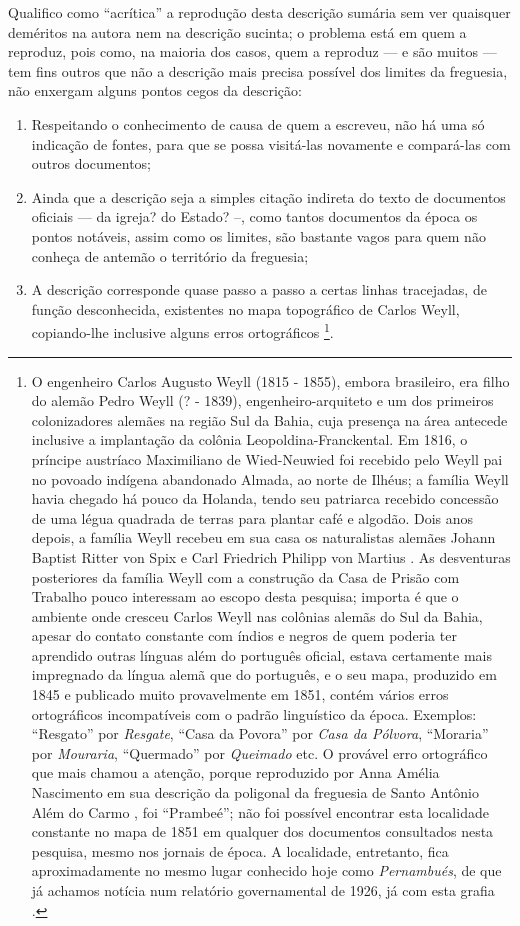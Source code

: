 Qualifico como ``acrítica'' a reprodução desta descrição sumária sem ver quaisquer deméritos na autora nem na descrição sucinta; o problema está em quem a reproduz, pois como, na maioria dos casos, quem a reproduz --- e são muitos --- tem fins outros que não a descrição mais precisa possível dos limites da freguesia, não enxergam alguns pontos cegos da descrição:
\begin{enumerate}
\item Respeitando o conhecimento de causa de quem a escreveu, não há uma só indicação de fontes, para que se possa visitá-las novamente e compará-las com outros documentos;
\item Ainda que a descrição seja a simples citação indireta do texto de documentos oficiais --- da igreja? do Estado? --, como tantos documentos da época os pontos notáveis, assim como os limites, são bastante vagos para quem não conheça de antemão o território da freguesia;
\item A descrição corresponde quase passo a passo a certas linhas tracejadas, de função desconhecida, existentes no mapa topográfico de Carlos Weyll, copiando-lhe inclusive alguns erros ortográficos \cite{weyll_mappa_1851}\footnote{O engenheiro Carlos Augusto Weyll (1815 - 1855), embora brasileiro, era filho do alemão Pedro Weyll (? - 1839), engenheiro-arquiteto e um dos primeiros colonizadores alemães na região Sul da Bahia, cuja presença na área antecede inclusive a implantação da colônia Leopoldina-Franckental. Em 1816, o príncipe austríaco Maximiliano de Wied-Neuwied foi recebido pelo Weyll pai no povoado indígena abandonado Almada, ao norte de Ilhéus; a família Weyll havia chegado há pouco da Holanda, tendo seu patriarca recebido concessão de uma légua quadrada de terras para plantar café e algodão. Dois anos depois, a família Weyll recebeu em sua casa os naturalistas alemães Johann Baptist Ritter von Spix e Carl Friedrich Philipp von Martius \cite[pp.~458-460]{oberacker_leopoldina_1972}. As desventuras posteriores da família Weyll com a construção da Casa de Prisão com Trabalho pouco interessam ao escopo desta pesquisa; importa é que o ambiente onde cresceu Carlos Weyll nas colônias alemãs do Sul da Bahia, apesar do contato constante com índios e negros de quem poderia ter aprendido outras línguas além do português oficial, estava certamente mais impregnado da língua alemã que do português, e o seu mapa, produzido em 1845 \cite[p.~31]{bahia_rpe_1846} e publicado muito provavelmente em 1851, contém vários erros ortográficos incompatíveis com o padrão linguístico da época. Exemplos: ``Resgato'' por \textit{Resgate}, ``Casa da Povora'' por \textit{Casa da Pólvora}, ``Moraria'' por \textit{Mouraria}, ``Quermado'' por \textit{Queimado} etc. O provável erro ortográfico que mais chamou a atenção, porque reproduzido por Anna Amélia Nascimento em sua descrição da poligonal da freguesia de Santo Antônio Além do Carmo \cite[p.~55]{NASCIMENTO2007}, foi ``Prambeé''; não foi possível encontrar esta localidade constante no mapa de 1851 em qualquer dos documentos consultados nesta pesquisa, mesmo nos jornais de época. A localidade, entretanto, fica aproximadamente no mesmo lugar conhecido hoje como \textit{Pernambués}, de que já achamos notícia num relatório governamental de 1926, já com esta grafia \cite[p.~185]{bahia_rpe_1926}.}.

\end{enumerate}
